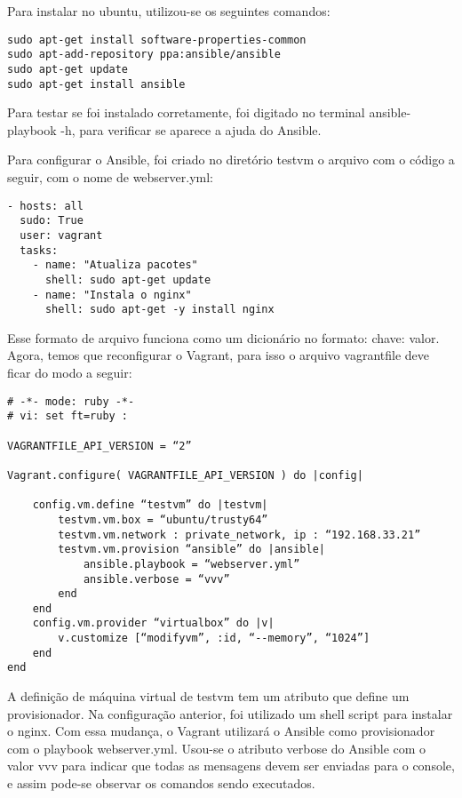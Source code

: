 Para instalar no ubuntu, utilizou-se os seguintes comandos:
\begin{lstlisting}
sudo apt-get install software-properties-common
sudo apt-add-repository ppa:ansible/ansible
sudo apt-get update
sudo apt-get install ansible
\end{lstlisting}
Para testar se foi instalado corretamente, foi digitado no terminal 
ansible-playbook -h, para verificar se aparece a ajuda do Ansible.

Para configurar o Ansible, foi criado no diretório testvm o 
arquivo com o código a seguir, com o nome de webserver.yml:
\begin{lstlisting}
- hosts: all
  sudo: True
  user: vagrant
  tasks:
    - name: "Atualiza pacotes"
      shell: sudo apt-get update
    - name: "Instala o nginx"
      shell: sudo apt-get -y install nginx
\end{lstlisting}
Esse formato de arquivo funciona como um dicionário no 
formato: chave: valor. Agora, temos que reconfigurar o Vagrant,
para isso o arquivo vagrantfile deve ficar do modo a seguir:
\begin{lstlisting}
# -*- mode: ruby -*-
# vi: set ft=ruby :

VAGRANTFILE_API_VERSION = “2”

Vagrant.configure( VAGRANTFILE_API_VERSION ) do |config|

	config.vm.define “testvm” do |testvm|
		testvm.vm.box = “ubuntu/trusty64”
		testvm.vm.network : private_network, ip : “192.168.33.21”
		testvm.vm.provision “ansible” do |ansible|
			ansible.playbook = “webserver.yml”
			ansible.verbose = “vvv”
		end
	end
	config.vm.provider “virtualbox” do |v|
		v.customize [“modifyvm”, :id, “--memory”, “1024”]
	end
end
\end{lstlisting}
A definição de máquina virtual de testvm tem um atributo 
que define um provisionador. Na configuração anterior, foi 
utilizado um shell script para instalar o nginx. Com essa 
mudança, o Vagrant utilizará o Ansible como provisionador 
com o playbook webserver.yml. Usou-se o atributo verbose 
do Ansible com o valor vvv para indicar que todas as 
mensagens devem ser enviadas para o console, e assim 
pode-se observar os comandos sendo executados.

